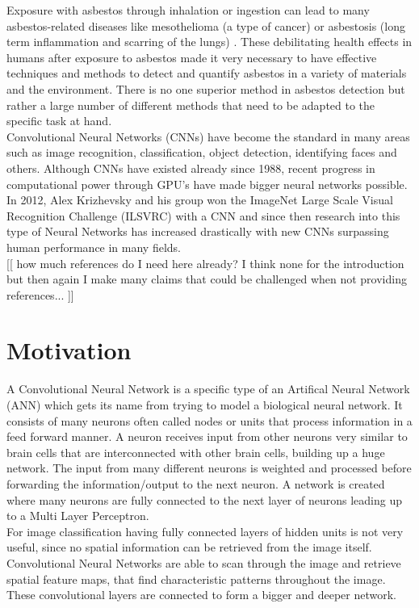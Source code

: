 Exposure with asbestos through inhalation or ingestion can lead to many asbestos-related diseases like mesothelioma (a type of cancer) or asbestosis (long term inflammation and scarring of the lungs) \cite{asbestosMaacenter, MesotheliomaWiki, asbestosisWiki}. These debilitating health effects in humans after exposure to asbestos made it very necessary to have effective techniques and methods to detect and quantify asbestos in a variety of materials and the environment. There is no one superior method in asbestos detection but rather a large number of different methods that need to be adapted to the specific task at hand. \\

Convolutional Neural Networks (CNNs) have become the standard in many areas such as image recognition, classification, object detection, identifying faces and others. Although CNNs have existed already since 1988, recent progress in computational power through GPU's have made bigger neural networks possible. In 2012, Alex Krizhevsky and his group won the ImageNet Large Scale Visual Recognition Challenge (ILSVRC) with a CNN and since then research into this type of Neural Networks has increased drastically with new CNNs surpassing human performance in many fields. \\

[[ how much references do I need here already?  I think none for the introduction but then again I make many claims that could be challenged when not providing references... ]]

\section{Motivation}

A Convolutional Neural Network is a specific type of an Artifical Neural Network (ANN) which gets its name from trying to model a biological neural network. It consists of many neurons often called nodes or units that process information in a feed forward manner. A neuron receives input from other neurons very similar to brain cells that are interconnected with other brain cells, building up a huge network. The input from many different neurons is weighted and processed before forwarding the information/output to the next neuron. A network is created where many neurons are fully connected to the next layer of neurons leading up to a Multi Layer Perceptron. \\

For image classification having fully connected layers of hidden units is not very useful, since no spatial information can be retrieved from the image itself. Convolutional Neural Networks are able to scan through the image and retrieve spatial feature maps, that find characteristic patterns throughout the image. These convolutional layers are connected to form a bigger and deeper network.  \\

